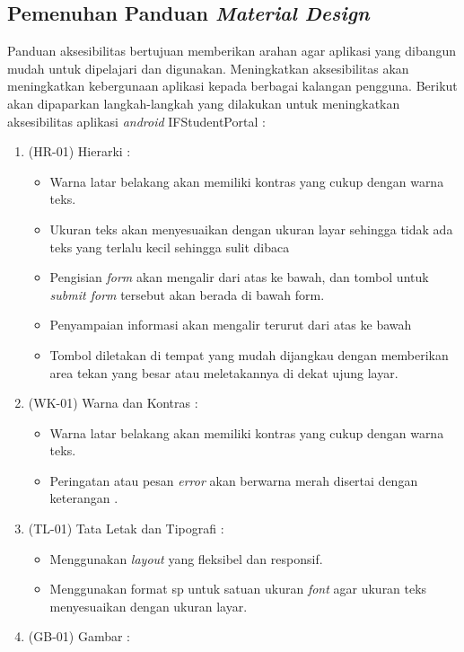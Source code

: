 \subsection{Pemenuhan Panduan \textit{Material Design}}
Panduan aksesibilitas bertujuan memberikan arahan agar aplikasi yang dibangun mudah untuk dipelajari dan digunakan. Meningkatkan aksesibilitas akan meningkatkan kebergunaan aplikasi kepada berbagai kalangan pengguna. Berikut akan dipaparkan langkah-langkah yang dilakukan untuk meningkatkan aksesibilitas aplikasi \textit{android} IFStudentPortal :
\begin{enumerate} 
    \item (HR-01) Hierarki : 
    \begin{itemize}
        \item Warna latar belakang akan memiliki kontras yang cukup dengan warna teks.
        \item Ukuran teks akan menyesuaikan dengan ukuran layar sehingga tidak ada teks yang terlalu kecil sehingga sulit dibaca
        \item Pengisian \textit{form} akan mengalir dari atas ke bawah, dan tombol untuk \textit{submit form} tersebut akan berada di bawah form.
        \item Penyampaian informasi akan mengalir terurut dari atas ke bawah
        \item Tombol diletakan di tempat yang mudah dijangkau dengan memberikan area tekan yang besar atau meletakannya di dekat ujung layar.
    \end{itemize}
    \item (WK-01) Warna dan Kontras : 
    \begin{itemize}
        \item Warna latar belakang akan memiliki kontras yang cukup dengan warna teks.
        \item Peringatan atau pesan \textit{error} akan berwarna merah disertai dengan keterangan .
    \end{itemize}
    \item (TL-01) Tata Letak dan Tipografi : 
    \begin{itemize}
        \item Menggunakan \textit{layout} yang fleksibel dan responsif.
        \item Menggunakan format sp untuk satuan ukuran \textit{font} agar ukuran teks menyesuaikan dengan ukuran layar.
        \end{itemize}
    \item (GB-01) Gambar : 

\end{enumerate}
